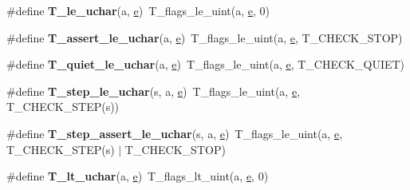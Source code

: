 \begin{DoxyCompactItemize}
\#define {\bfseries T\+\_\+le\+\_\+uchar}(a,  \mbox{\hyperlink{sun4u_2tte_8h_a8b0b9ed08e0e18920ec2682f48228c27}{e}})~T\+\_\+flags\+\_\+le\+\_\+uint(a, \mbox{\hyperlink{sun4u_2tte_8h_a8b0b9ed08e0e18920ec2682f48228c27}{e}}, 0)
\item 
\mbox{\label{group__RTEMSTestFrameworkChecksUChar_gad687180d0bef4c82facc2be22c3b7e63}} 
\#define {\bfseries T\+\_\+assert\+\_\+le\+\_\+uchar}(a,  \mbox{\hyperlink{sun4u_2tte_8h_a8b0b9ed08e0e18920ec2682f48228c27}{e}})~T\+\_\+flags\+\_\+le\+\_\+uint(a, \mbox{\hyperlink{sun4u_2tte_8h_a8b0b9ed08e0e18920ec2682f48228c27}{e}}, T\+\_\+\+C\+H\+E\+C\+K\+\_\+\+S\+T\+OP)
\item 
\mbox{\label{group__RTEMSTestFrameworkChecksUChar_ga665a36cda73ceb0c96286dcd0cb5e9a5}} 
\#define {\bfseries T\+\_\+quiet\+\_\+le\+\_\+uchar}(a,  \mbox{\hyperlink{sun4u_2tte_8h_a8b0b9ed08e0e18920ec2682f48228c27}{e}})~T\+\_\+flags\+\_\+le\+\_\+uint(a, \mbox{\hyperlink{sun4u_2tte_8h_a8b0b9ed08e0e18920ec2682f48228c27}{e}}, T\+\_\+\+C\+H\+E\+C\+K\+\_\+\+Q\+U\+I\+ET)
\item 
\mbox{\label{group__RTEMSTestFrameworkChecksUChar_ga509b58c7ebee8deb49a2f89c4ba624fa}} 
\#define {\bfseries T\+\_\+step\+\_\+le\+\_\+uchar}(s,  a,  \mbox{\hyperlink{sun4u_2tte_8h_a8b0b9ed08e0e18920ec2682f48228c27}{e}})~T\+\_\+flags\+\_\+le\+\_\+uint(a, \mbox{\hyperlink{sun4u_2tte_8h_a8b0b9ed08e0e18920ec2682f48228c27}{e}}, T\+\_\+\+C\+H\+E\+C\+K\+\_\+\+S\+T\+EP(s))
\item 
\mbox{\label{group__RTEMSTestFrameworkChecksUChar_ga9fad33b649ffb0abdc89a8d361202937}} 
\#define {\bfseries T\+\_\+step\+\_\+assert\+\_\+le\+\_\+uchar}(s,  a,  \mbox{\hyperlink{sun4u_2tte_8h_a8b0b9ed08e0e18920ec2682f48228c27}{e}})~T\+\_\+flags\+\_\+le\+\_\+uint(a, \mbox{\hyperlink{sun4u_2tte_8h_a8b0b9ed08e0e18920ec2682f48228c27}{e}}, T\+\_\+\+C\+H\+E\+C\+K\+\_\+\+S\+T\+EP(s) $\vert$ T\+\_\+\+C\+H\+E\+C\+K\+\_\+\+S\+T\+OP)
\item 
\mbox{\label{group__RTEMSTestFrameworkChecksUChar_gabc498b5fd1e3921f9a77b704951e507c}} 
\#define {\bfseries T\+\_\+lt\+\_\+uchar}(a,  \mbox{\hyperlink{sun4u_2tte_8h_a8b0b9ed08e0e18920ec2682f48228c27}{e}})~T\+\_\+flags\+\_\+lt\+\_\+uint(a, \mbox{\hyperlink{sun4u_2tte_8h_a8b0b9ed08e0e18920ec2682f48228c27}{e}}, 0)

\end{DoxyCompactItemize}
